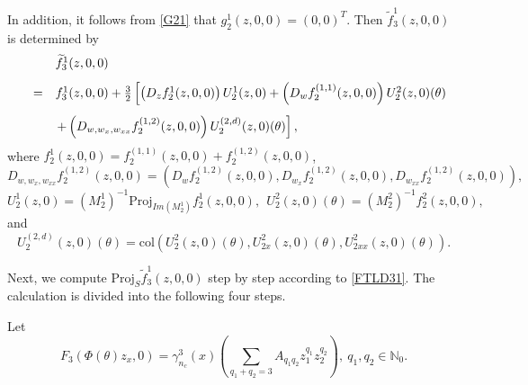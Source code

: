 \documentclass[11pt]{article}
\theoremstyle{definition}
\theoremstyle{remark}
\numberwithin{equation}{section}
\begin{document}
In addition, it follows from \eqref{G21}   that $g_2^1(z,0,0)=(0, 0)^T$. Then  $\widetilde{f}_3^1(z,0,0)$ is determined  by
\begin{equation}
\label{FTLD31}
\begin{array}{lll}
&&\widetilde{f}_3^1(z,0,0)\vspace{0.3cm}\\
&=&f_3^1(z,0,0)+\frac{3}{2}\left[\left(D_zf_2^1(z,0,0)\right)U_2^1(z,0)+\left(D_wf_2^{(1,1)}(z,0,0)\right)U_2^2(z,0)(\theta)\right.\vspace{0.3cm}\\
&&\left.+\left(D_{w,w_x,w_{xx}}f^{(1,2)}_2(z,0,0) \right)U_2^{(2,d)}(z, 0)(\theta)\right],
\end{array}
 \end{equation}
 where $f_2^1(z,0,0)=f_2^{(1,1)}(z,0,0)+f_2^{(1,2)}(z,0,0)$,
 $$D_{w,w_x,w_{xx}}f^{(1,2)}_2(z,0,0)=\left(D_wf^{(1,2)}_2(z,0,0), D_{w_x}f^{(1,2)}_2(z,0,0), D_{w_{xx}}f^{(1,2)}_2(z,0,0) \right),$$
  \begin{equation}
  \label{U212}
U_2^1(z,0)=\left(M_2^1\right)^{-1}\mbox{Proj}_{Im\left(M_2^1\right)}f_2^1(z,0,0),~~U_2^2(z,0)(\theta)=\left(M_2^2\right)^{-1}f_2^2(z,0,0),
 \end{equation}
 and
\begin{equation}
\label{U2D}
 U_2^{(2,d)}(z, 0)(\theta)=\mbox{col}\left(U_2^2(z, 0)(\theta), U_{2x}^2(z, 0)(\theta), U_{2xx}^2(z, 0)(\theta)\right).
 \end{equation}



 Next, we compute  $\mbox{Proj}_{S}\widetilde{f}_3^1(z,0,0)$ step by step according to \eqref{FTLD31}. The calculation is divided into the following four steps.

\vspace{0.4cm}

Let
\begin{equation}
\label{F3EXP}
F_3(\Phi(\theta)
z_x,0)=\gamma_{n_c}^3(x) \left(\sum_{q_1+q_2=3}A_{q_1q_2}z_1^{q_1}z_2^{q_2}\right), ~q_1,q_2\in \mathbb{N}_0.
\end{equation}
 
\end{document}
